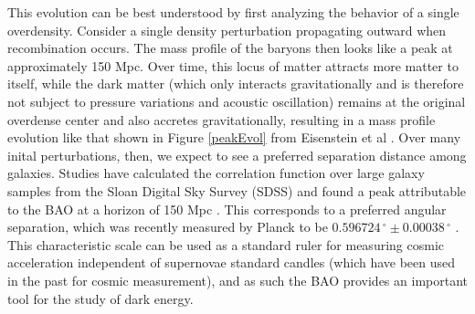 \documentclass[12pt]{article}
\begin{document}
This evolution can be best understood by first analyzing the behavior of a single overdensity. Consider a single density perturbation propagating outward when recombination occurs. The mass profile of the baryons then looks like a peak at approximately 150 Mpc. Over time, this locus of matter attracts more matter to itself, while the dark matter (which only interacts gravitationally and is therefore not subject to pressure variations and acoustic oscillation) remains at the original overdense center and also accretes gravitationally, resulting in a mass profile evolution like that shown in Figure \ref{peakEvol} from Eisenstein et al \cite{Eisensteinetal}. Over many inital perturbations, then, we expect to see a preferred separation distance among galaxies. Studies have calculated the correlation function over large galaxy samples from the Sloan Digital Sky Survey (SDSS) and found a peak attributable to the BAO at a horizon of 150 Mpc \cite{Eisensteinetal}. This corresponds to a preferred angular separation, which was recently measured by Planck to be $0.596724\,^{\circ}\pm 0.00038\,^{\circ}$ \cite{Planck}. This characteristic scale can be used as a standard ruler for measuring cosmic acceleration independent of supernovae standard candles (which have been used in the past for cosmic measurement), and as such the BAO provides an important tool for the study of dark energy.
\end{document}
